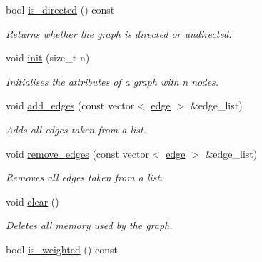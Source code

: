 \begin{DoxyCompactItemize}
bool \hyperlink{classlgraph_1_1utils_1_1uugraph_a20a86c5b56527e8abcbb90bae95d6605}{is\+\_\+directed} () const 
\begin{DoxyCompactList}\small\item\em Returns whether the graph is directed or undirected. \end{DoxyCompactList}\item 
void \hyperlink{classlgraph_1_1utils_1_1uxgraph_ab1e7ab39be6e8ca6149eef47dd51b155}{init} (size\+\_\+t n)
\begin{DoxyCompactList}\small\item\em Initialises the attributes of a graph with {\itshape n} nodes. \end{DoxyCompactList}\item 
void \hyperlink{classlgraph_1_1utils_1_1uxgraph_af6f7c0a2dc67706a07bd58f06b3dcf9f}{add\+\_\+edges} (const vector$<$ \hyperlink{namespacelgraph_1_1utils_a6510284ce1b1ae5dc97ce5d2de426e10}{edge} $>$ \&edge\+\_\+list)
\begin{DoxyCompactList}\small\item\em Adds all edges taken from a list. \end{DoxyCompactList}\item 
void \hyperlink{classlgraph_1_1utils_1_1uxgraph_a83e447e3c405700f36a1cce1c227f3f1}{remove\+\_\+edges} (const vector$<$ \hyperlink{namespacelgraph_1_1utils_a6510284ce1b1ae5dc97ce5d2de426e10}{edge} $>$ \&edge\+\_\+list)
\begin{DoxyCompactList}\small\item\em Removes all edges taken from a list. \end{DoxyCompactList}\item 
void \hyperlink{classlgraph_1_1utils_1_1uxgraph_ae76c83683dc7527fe5394d67437a7107}{clear} ()
\begin{DoxyCompactList}\small\item\em Deletes all memory used by the graph. \end{DoxyCompactList}\item 
bool \hyperlink{classlgraph_1_1utils_1_1uxgraph_ae1c3f40bb80ab20c2de96735ccde7b3f}{is\+\_\+weighted} () const \hypertarget{classlgraph_1_1utils_1_1uxgraph_ae1c3f40bb80ab20c2de96735ccde7b3f}{}\label{classlgraph_1_1utils_1_1uxgraph_ae1c3f40bb80ab20c2de96735ccde7b3f}


\end{DoxyCompactItemize}
